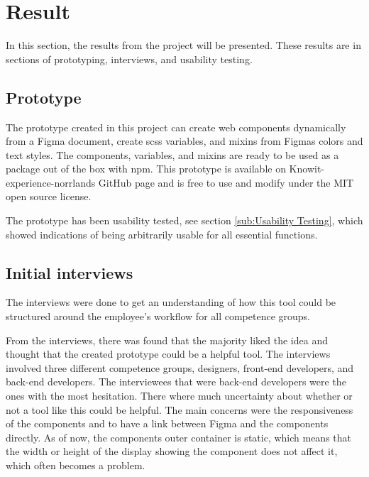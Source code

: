 \section{Result}


In this section, the results from the project will be presented. These results are in sections of prototyping, interviews, and usability testing.

\subsection{Prototype}%
\label{sub:Prototype}
The prototype created in this project can create web components dynamically from a Figma document, create \acrshort{scss} variables, and \glspl{mixin} from Figmas colors and text styles. The components, variables, and \glspl{mixin} are ready to be used as a package out of the box with \acrshort{npm}. This prototype is available on Knowit- experience-norrlands GitHub page and is free to use and modify under the MIT open source license. 

The prototype has been usability tested, see section \ref{sub:Usability Testing}, which showed indications of being arbitrarily usable for all essential functions. 

\subsection{Initial interviews}%
\label{sub:Initial interviews}
The interviews were done to get an understanding of how this tool could be structured around the employee's workflow for all competence groups.

From the interviews, there was found that the majority liked the idea and thought that the created prototype could be a helpful tool.  The interviews involved three different competence groups, designers, front-end developers, and back-end developers. The interviewees that were back-end developers were the ones with the most hesitation. There where much uncertainty about whether or not a tool like this could be helpful. The main concerns were the responsiveness of the \glspl{component} and to have a link between Figma and the \glspl{component} directly. As of now, the \glspl{component} outer container is static, which means that the width or height of the display showing the \gls{component} does not affect it, which often becomes a problem.   

